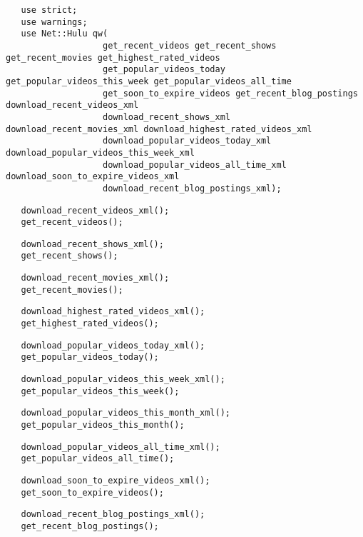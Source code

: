 \begin{verbatim}
   use strict;
   use warnings;
   use Net::Hulu qw(
                   get_recent_videos get_recent_shows get_recent_movies get_highest_rated_videos
                   get_popular_videos_today get_popular_videos_this_week get_popular_videos_all_time
                   get_soon_to_expire_videos get_recent_blog_postings download_recent_videos_xml
                   download_recent_shows_xml download_recent_movies_xml download_highest_rated_videos_xml
                   download_popular_videos_today_xml download_popular_videos_this_week_xml
                   download_popular_videos_all_time_xml download_soon_to_expire_videos_xml
                   download_recent_blog_postings_xml);
\end{verbatim}
\begin{verbatim}
   download_recent_videos_xml();
   get_recent_videos();
\end{verbatim}
\begin{verbatim}
   download_recent_shows_xml();
   get_recent_shows();
\end{verbatim}
\begin{verbatim}
   download_recent_movies_xml();
   get_recent_movies();
\end{verbatim}
\begin{verbatim}
   download_highest_rated_videos_xml();
   get_highest_rated_videos();
\end{verbatim}
\begin{verbatim}
   download_popular_videos_today_xml();
   get_popular_videos_today();
\end{verbatim}
\begin{verbatim}
   download_popular_videos_this_week_xml();
   get_popular_videos_this_week();
\end{verbatim}
\begin{verbatim}
   download_popular_videos_this_month_xml();
   get_popular_videos_this_month();
\end{verbatim}
\begin{verbatim}
   download_popular_videos_all_time_xml();
   get_popular_videos_all_time();
\end{verbatim}
\begin{verbatim}
   download_soon_to_expire_videos_xml();
   get_soon_to_expire_videos();
\end{verbatim}
\begin{verbatim}
   download_recent_blog_postings_xml();
   get_recent_blog_postings();
\end{verbatim}
